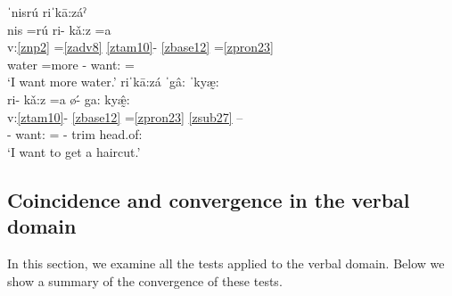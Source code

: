 \documentclass[output=paper]{langscibook}
\begin{document}
\ea\label{bkm:Ref82613427}
{ˈnisrú riˈkā:záˀ}\\
\glll nis =rú ri- kǎ:z =a\\
v:\ref{znp2} =\ref{zadv8} \ref{ztam10}{}- \ref{zbase12} =\ref{zpron23}\\
water =more  \Hab{}- want:\First\Sg{} =\First\Sg{}\\
\glt `I want more water.'
\ex\label{bkm:Ref82613444}
{riˈkā:zá ˈgâ: ˈkyæ̰:}\\
\glll ri- kǎ:z =a ø\'{-} ga: kyæ̰̂:\\
v:\ref{ztam10}- \ref{zbase12} =\ref{zpron23} \ref{zsub27} – \\
\Hab{}- want:\First\Sg{} =\First\Sg{} \Pot{}- trim head.of:\First\Sg{}\\
\glt `I want to get a haircut.'
\z

\subsection{Coincidence and convergence in the verbal domain} 

In this section, we examine all the tests applied to the verbal domain. Below we show a summary of the convergence of these tests. 
\end{document}
